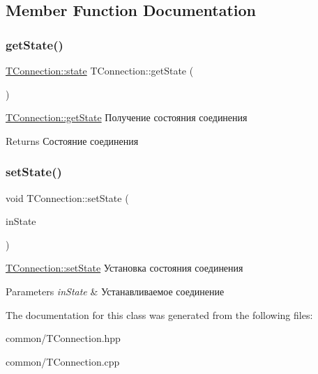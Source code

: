 \subsection{Member Function Documentation}
\mbox{\label{class_t_connection_a3d5a8ced525102cb5af69c5b3bf53beb}} 
\subsubsection{\texorpdfstring{get\+State()}{getState()}}
{\footnotesize\ttfamily \hyperlink{class_t_connection_a93c51547a49faa91936324245c95b7b3}{T\+Connection\+::state} T\+Connection\+::get\+State (\begin{DoxyParamCaption}{ }\end{DoxyParamCaption})}



\hyperlink{class_t_connection_a3d5a8ced525102cb5af69c5b3bf53beb}{T\+Connection\+::get\+State} Получение состояния соединения 

\begin{DoxyReturn}{Returns}
Состояние соединения 
\end{DoxyReturn}
\mbox{\label{class_t_connection_a93e5bd39a1a222d697d94cf5a686fe48}} 
\subsubsection{\texorpdfstring{set\+State()}{setState()}}
{\footnotesize\ttfamily void T\+Connection\+::set\+State (\begin{DoxyParamCaption}\item[{\hyperlink{class_t_connection_a93c51547a49faa91936324245c95b7b3}{T\+Connection\+::state} \&}]{in\+State }\end{DoxyParamCaption})}



\hyperlink{class_t_connection_a93e5bd39a1a222d697d94cf5a686fe48}{T\+Connection\+::set\+State} Установка состояния соединения 


\begin{DoxyParams}{Parameters}
{\em in\+State} & Устанавливаемое соединение \\
\hline
\end{DoxyParams}


The documentation for this class was generated from the following files\+:\begin{DoxyCompactItemize}
\item 
common/T\+Connection.\+hpp\item 
common/T\+Connection.\+cpp\end{DoxyCompactItemize}
